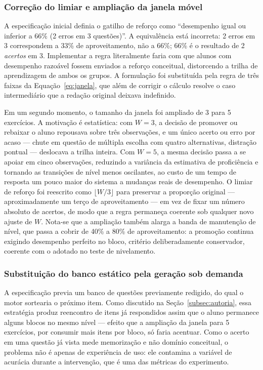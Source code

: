 \documentclass[10pt, a4paper, twocolumn]{article}
\begin{document}
\subsubsection{Correção do limiar e ampliação da janela móvel}

A especificação inicial definia o gatilho de reforço como ``desempenho igual ou
inferior a 66\% (2 erros em 3 questões)''. A equivalência está incorreta: 2 erros
em 3 correspondem a 33\% de aproveitamento, não a 66\%; 66\% é o resultado de 2
\textit{acertos} em 3. Implementar a regra literalmente faria com que alunos com
desempenho razoável fossem enviados a reforço conceitual, distorcendo a trilha de
aprendizagem de ambos os grupos. A formulação foi substituída pela regra de três
faixas da Equação~\ref{eq:janela}, que além de corrigir o cálculo resolve o caso
intermediário que a redação original deixava indefinido.

Em um segundo momento, o tamanho da janela foi ampliado de 3 para 5 exercícios.
A motivação é estatística: com $W = 3$, a decisão de promover ou rebaixar o aluno
repousava sobre três observações, e um único acerto ou erro por acaso ---
chute em questão de múltipla escolha com quatro alternativas, distração pontual
--- deslocava a trilha inteira. Com $W = 5$, a mesma decisão passa a se apoiar em
cinco observações, reduzindo a variância da estimativa de proficiência e tornando
as transições de nível menos oscilantes, ao custo de um tempo de resposta um
pouco maior do sistema a mudanças reais de desempenho. O limiar de reforço foi
reescrito como $\lfloor W/3 \rfloor$ para preservar a proporção original ---
aproximadamente um terço de aproveitamento --- em vez de fixar um número
absoluto de acertos, de modo que a regra permaneça coerente sob qualquer novo
ajuste de $W$. Nota-se que a ampliação também alarga a banda de manutenção de
nível, que passa a cobrir de 40\% a 80\% de aproveitamento: a promoção continua
exigindo desempenho perfeito no bloco, critério deliberadamente conservador,
coerente com o adotado no teste de nivelamento.

\subsubsection{Substituição do banco estático pela geração sob demanda}

A especificação previa um banco de questões previamente redigido, do qual o
motor sortearia o próximo item. Como discutido na Seção~\ref{subsec:autoria},
essa estratégia produz reencontro de itens já respondidos assim que o aluno
permanece alguns blocos no mesmo nível --- efeito que a ampliação da janela para
5 exercícios, por consumir mais itens por bloco, só faria acentuar. Como o acerto
em uma questão já vista mede memorização e não domínio conceitual, o problema não
é apenas de experiência de uso: ele contamina a variável de acurácia durante a
intervenção, que é uma das métricas do experimento.
\end{document}
